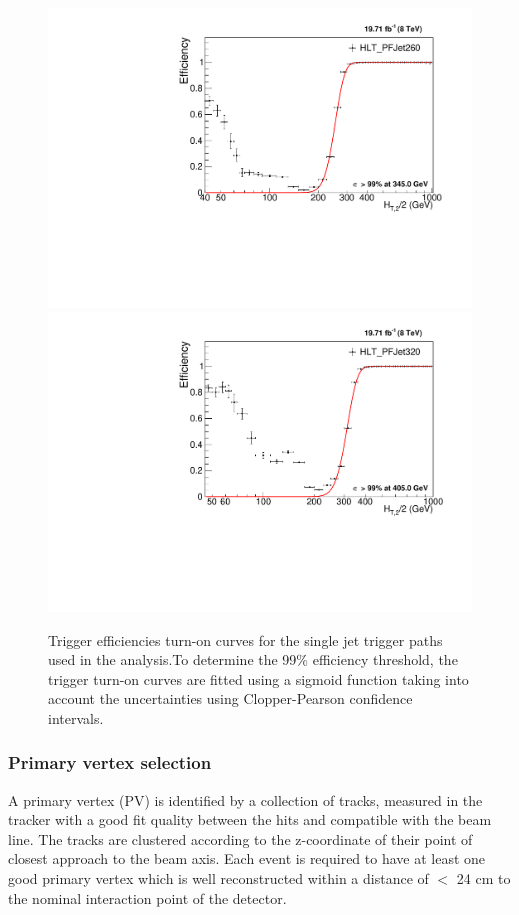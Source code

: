 \begin{figure}[!htbp]
\begin{center}
 \includegraphics[scale=0.4]{Plots_HT_2_150/Fit_Turn_Efficiency_260_2_ht_2.pdf}\\
 \includegraphics[scale=0.4]{Plots_HT_2_150/Fit_Turn_Efficiency_320_2_ht_2.pdf}%
 \caption{Trigger efficiencies turn-on curves for the single jet trigger paths used in the analysis.To determine the 99\% efficiency threshold, the trigger turn-on curves are fitted using a sigmoid function taking into account the uncertainties using Clopper-Pearson confidence intervals.}
 \label{fig:trig_eff}
 \end{center}
\end{figure}

\subsubsection{Primary vertex selection}
A primary vertex (PV) is identified by a collection of tracks, measured in the tracker with a good fit quality between the hits and compatible with the beam line. The tracks are clustered according to the z-coordinate of their point of closest approach to the beam axis. Each event is required to have at least one good primary vertex which is well reconstructed within a distance of  $<$ 24 cm to the nominal interaction point of the detector.

